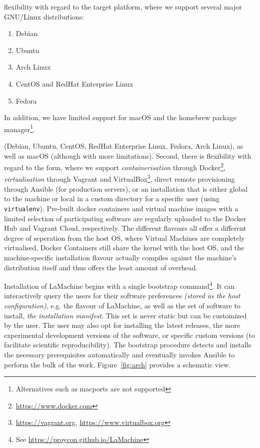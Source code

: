 \documentclass[a4paper,11pt]{article}
\begin{document}
flexibility with regard to the target platform, where we support several major GNU/Linux distributions:

\begin{enumerate}
    \item Debian
    \item Ubuntu
    \item Arch Linux
    \item CentOS and RedHat Enterprise Linux
    \item Fedora
\end{enumerate}

In addition, we have limited support for macOS and the homebrew package manager\footnote{Alternatives such as macports are not
supported}.

(Debian, Ubuntu,
CentOS, RedHat Enterprise Linux, Fedora, Arch Linux), as well as macOS (although with more limitations). Second, there is
flexibility with regard to the form, where we support \emph{containerisation} through
Docker\footnote{\url{https://www.docker.com}}, \emph{virtualisation} through Vagrant
and VirtualBox\footnote{\url{https://vagrant.org}, \url{https://www.virtualbox.org}}, direct remote provisioning through Ansible (for production
servers), or an installation that is either global to the machine or local in a custom directory for a specific user
(using \texttt{virtualenv}). Pre-built docker containers and virtual machine images with a limited selection of participating software are regularly
uploaded to the Docker Hub and Vagrant Cloud, respectively. The different flavours all offer a different degree of
seperation from the host OS, where Virtual Machines are completely virtualised, Docker Containers still share the kernel
with the host OS, and the machine-specific installation flavour actually compiles against the machine's distribution itself and thus
offers the least amount of overhead.

Installation of LaMachine begins with a single bootstrap command\footnote{See
\url{https://proycon.github.io/LaMachine}}.  It can interactively query the users for their software preferences
\emph{(stored as the host configuration)}, e.g. the flavour of LaMachine, as well as the set of software to install,
\emph{the installation manifest}. This set is never static but can be customized by the user.  The user may also opt for installing the latest releases, the more
experimental development versions of the software, or specific custom versions (to facilitate scientific
reproducibility). The bootstrap procedure detects and installs the necessary prerequisites automatically and eventually
invokes Ansible to perform the bulk of the work.  Figure~\ref{fig:arch} provides a schematic view.
\end{document}

